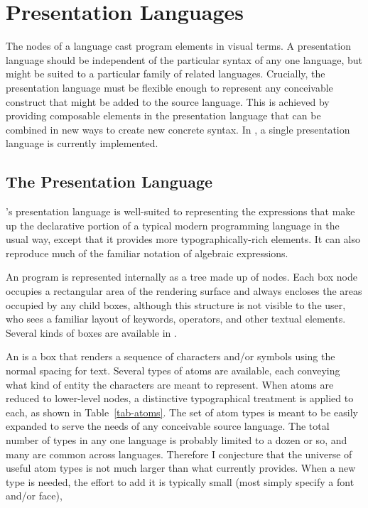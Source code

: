 %
%

\section{Presentation Languages}
\label{expr}
The nodes of a  language cast program elements in visual terms. A presentation language should be independent of the particular syntax of any one language, but might be suited to a particular family of related languages. Crucially, the presentation language must be flexible enough to represent any conceivable construct that might be added to the source language. This is achieved by providing composable elements in the presentation language that can be combined in new ways to create new concrete syntax. In \Meta, a single presentation language is currently implemented.

\subsection{The \textit{} Presentation Language}

\Meta's  presentation language is well-suited to representing the expressions that make up the declarative portion of a typical modern programming language in the usual way, except that it provides more typographically-rich elements. It can also reproduce much of the familiar notation of algebraic expressions. 

An  program is represented internally as a tree made up of  nodes. Each box node occupies a rectangular area of the rendering surface and always encloses the areas occupied by any child boxes, although this structure is not visible to the user, who sees a familiar layout of keywords, operators, and other textual elements. Several kinds of boxes are available in .

An  is a box that renders a sequence of characters and/or symbols using the normal spacing for text. Several types of atoms are available, each conveying what kind of entity the characters are meant to represent. When atoms are reduced to lower-level nodes, a distinctive typographical treatment is applied to each, as shown in Table~\ref{tab-atoms}. The set of atom types is meant to be easily expanded to serve the needs of any conceivable source language. The total number of types in any one language is probably limited to a dozen or so, and many are common across languages. Therefore I conjecture that the universe of useful atom types is not much larger than what  currently provides. When a new type is needed, the effort to add it is typically small (most simply specify a font and/or face), 


